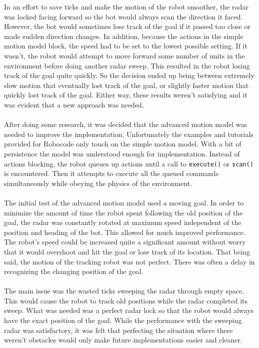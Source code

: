 \documentclass{aiaa-tc}%
\begin{document}
In an effort to save ticks and make the motion of the robot smoother, the radar was locked facing forward so the bot would always scan the direction it faced. However, the bot would sometimes lose track of the goal if it passed too close or made sudden direction changes. In addition, because the actions in the simple motion model block, the speed had to be set to the lowest possible setting. If it wasn't, the robot would attempt to move forward some number of units in the environment before doing another radar sweep. This resulted in the robot losing track of the goal quite quickly. So the decision ended up being between extremely slow motion that eventually lost track of the goal, or slightly faster motion that quickly lost track of the goal. Either way, these results weren't satisfying and it was evident that a new approach was needed. \\ \\
After doing some research, it was decided that the advanced motion model was needed to improve the implementation. Unfortunately the examples and tutorials provided for Robocode only touch on the simple motion model. With a bit of persistence the model was understood enough for implementation. Instead of actions blocking, the robot queues up actions until a call to \verb|execute()| or \verb|scan()| is encountered. Then it attempts to execute all the queued commands simultaneously while obeying the physics of the environment. \\ \\
The initial test of the advanced motion model used a moving goal. In order to minimize the amount of time the robot spent following the old position of the goal, the radar was constantly rotated at maximum speed independent of the position and heading of the bot. This allowed for much improved performance. The robot's speed could be increased quite a significant amount without worry that it would overshoot and hit the goal or lose track of its location. That being said, the motion of the tracking robot was not perfect. There was often a delay in recognizing the changing position of the goal. \\ \\
The main issue was the wasted ticks sweeping the radar through empty space. This would cause the robot to track old positions while the radar completed its sweep. What was needed was a perfect radar lock so that the robot would always have the exact position of the goal. While the performance with the sweeping radar was satisfactory, it was felt that perfecting the situation where there weren't obstacles would only make future implementations easier and cleaner.
\end{document}
